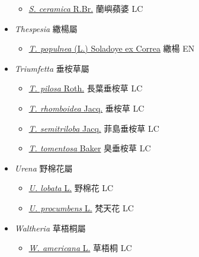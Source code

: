 \begin{itemize}
  \begin{itemize}
        \item[] \href{http://www.theplantlist.org/tpl1.1/search?q=Sterculia+ceramica}{\textit{S. ceramica} R.Br.}   蘭嶼蘋婆 LC
  \end{itemize}
 \item[] \textit{Thespesia} 繖楊屬
                    
  \begin{itemize}
        \item[] \href{http://www.theplantlist.org/tpl1.1/search?q=Thespesia+populnea}{\textit{T. populnea} (L.) Soladoye ex Correa}   繖楊 EN
  \end{itemize}
 \item[] \textit{Triumfetta} 垂桉草屬
                    
  \begin{itemize}
        \item[] \href{http://www.theplantlist.org/tpl1.1/search?q=Triumfetta+pilosa}{\textit{T. pilosa} Roth.}   長葉垂桉草 LC
        \item[] \href{http://www.theplantlist.org/tpl1.1/search?q=Triumfetta+rhomboidea}{\textit{T. rhomboidea} Jacq.}   垂桉草 LC
        \item[] \href{http://www.theplantlist.org/tpl1.1/search?q=Triumfetta+semitriloba}{\textit{T. semitriloba} Jacq.}   菲島垂桉草 LC
        \item[] \href{http://www.theplantlist.org/tpl1.1/search?q=Triumfetta+tomentosa}{\textit{T. tomentosa} Baker}   臭垂桉草 LC
  \end{itemize}
 \item[] \textit{Urena} 野棉花屬
                    
  \begin{itemize}
        \item[] \href{http://www.theplantlist.org/tpl1.1/search?q=Urena+lobata}{\textit{U. lobata} L.}   野棉花 LC
        \item[] \href{http://www.theplantlist.org/tpl1.1/search?q=Urena+procumbens}{\textit{U. procumbens} L.}   梵天花 LC
  \end{itemize}
 \item[] \textit{Waltheria} 草梧桐屬
                    
  \begin{itemize}
        \item[] \href{http://www.theplantlist.org/tpl1.1/search?q=Waltheria+americana}{\textit{W. americana} L.}   草梧桐 LC
  \end{itemize}
  \end{itemize}
